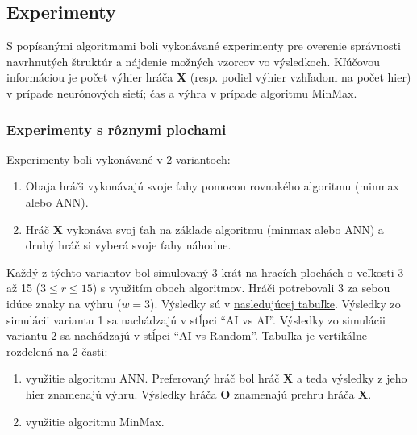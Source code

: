 \subsection{Experimenty}\label{subsec:experiments}
S popísanými algoritmami boli vykonávané experimenty pre overenie správnosti navrhnutých štruktúr a nájdenie možných
vzorcov vo výsledkoch.
Kľúčovou informáciou je počet výhier hráča \textbf{X} (resp. podiel výhier vzhľadom na počet hier) v prípade
neurónových sietí; čas a výhra v prípade algoritmu MinMax.

\subsubsection{Experimenty s rôznymi plochami}\label{subsec:experiments-board}

Experimenty boli vykonávané v 2 variantoch:
\begin{enumerate}
    \item Obaja hráči vykonávajú svoje ťahy pomocou rovnakého algoritmu (minmax alebo ANN).
    \item Hráč \textbf{X} vykonáva svoj ťah na základe algoritmu (minmax alebo ANN) a druhý hráč si vyberá svoje ťahy náhodne.
\end{enumerate}
Každý z týchto variantov bol simulovaný 3-krát na hracích plochách o veľkosti 3 až 15 ($3 \leq r \leq 15$) s využitím oboch algoritmov.
Hráči potrebovali 3 za sebou idúce znaky na výhru ($w = 3$).
Výsledky sú v \hyperref[table:experiments-boards]{nasledujúcej tabuľke}.
Výsledky zo simulácii variantu 1 sa nachádzajú v stĺpci \enquote{AI vs AI}.
Výsledky zo simulácii variantu 2 sa nachádzajú v stĺpci \enquote{AI vs Random}.
Tabuľka je vertikálne rozdelená na 2 časti:
\begin{enumerate}
    \item využitie algoritmu ANN.
    Preferovaný hráč bol hráč \textbf{X} a teda výsledky z jeho hier znamenajú výhru.
    Výsledky hráča \textbf{O} znamenajú prehru hráča \textbf{X}.
    \item využitie algoritmu MinMax.
\end{enumerate}

